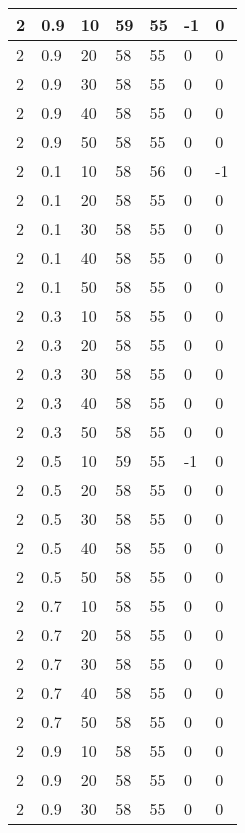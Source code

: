 \begin{longtable}{|l|l|l|l|l|l|l|}
		2     & 0.9 & 10   & 59 & 55 & -1  & 0   \\ \hline
		2     & 0.9 & 20   & 58 & 55 & 0   & 0   \\ \hline
		2     & 0.9 & 30   & 58 & 55 & 0   & 0   \\ \hline
		2     & 0.9 & 40   & 58 & 55 & 0   & 0   \\ \hline
		2     & 0.9 & 50   & 58 & 55 & 0   & 0   \\ \hline
		2     & 0.1 & 10   & 58 & 56 & 0   & -1  \\ \hline
		2     & 0.1 & 20   & 58 & 55 & 0   & 0   \\ \hline
		2     & 0.1 & 30   & 58 & 55 & 0   & 0   \\ \hline
		2     & 0.1 & 40   & 58 & 55 & 0   & 0   \\ \hline
		2     & 0.1 & 50   & 58 & 55 & 0   & 0   \\ \hline
		2     & 0.3 & 10   & 58 & 55 & 0   & 0   \\ \hline
		2     & 0.3 & 20   & 58 & 55 & 0   & 0   \\ \hline
		2     & 0.3 & 30   & 58 & 55 & 0   & 0   \\ \hline
		2     & 0.3 & 40   & 58 & 55 & 0   & 0   \\ \hline
		2     & 0.3 & 50   & 58 & 55 & 0   & 0   \\ \hline
		2     & 0.5 & 10   & 59 & 55 & -1  & 0   \\ \hline
		2     & 0.5 & 20   & 58 & 55 & 0   & 0   \\ \hline
		2     & 0.5 & 30   & 58 & 55 & 0   & 0   \\ \hline
		2     & 0.5 & 40   & 58 & 55 & 0   & 0   \\ \hline
		2     & 0.5 & 50   & 58 & 55 & 0   & 0   \\ \hline
		2     & 0.7 & 10   & 58 & 55 & 0   & 0   \\ \hline
		2     & 0.7 & 20   & 58 & 55 & 0   & 0   \\ \hline
		2     & 0.7 & 30   & 58 & 55 & 0   & 0   \\ \hline
		2     & 0.7 & 40   & 58 & 55 & 0   & 0   \\ \hline
		2     & 0.7 & 50   & 58 & 55 & 0   & 0   \\ \hline
		2     & 0.9 & 10   & 58 & 55 & 0   & 0   \\ \hline
		2     & 0.9 & 20   & 58 & 55 & 0   & 0   \\ \hline
		2     & 0.9 & 30   & 58 & 55 & 0   & 0   \\ \hline

\end{longtable}
